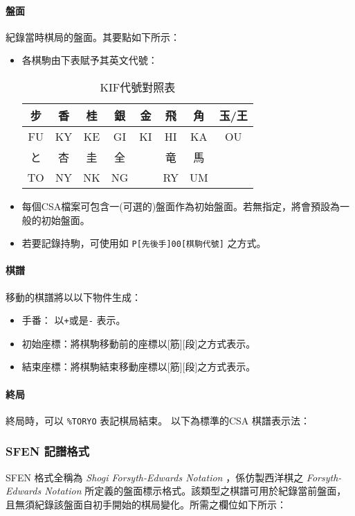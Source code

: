 	
	
	\paragraph{盤面} 紀錄當時棋局的盤面。其要點如下所示：
	\begin{itemize}
	
	    \item 各棋駒由下表賦予其英文代號：
	    \begin{table}[h]
	        \centering
	        \begin{tabular}{c|c|c|c|c|c|c|c}
	           步  &香 & 桂 &銀&金&飛&角&玉/王 \\
	           \hline
	             FU  &KY & KE &GI&KI&HI&KA&OU\\
	            \hline
	            と  &杏 & 圭 &全&&竜&馬\\
	            \hline
	            TO &NY & NK &NG& &RY&UM\\
	        \end{tabular}
	        \caption{KIF代號對照表}
	        \label{tab:my_label}
	    \end{table}
	    \item 每個CSA檔案可包含一(可選的)盤面作為初始盤面。若無指定，將會預設為一般的初始盤面。

	    \item 若要記錄持駒，可使用如 \verb|P[先後手]00[棋駒代號]| 之方式。 
	    
	\end{itemize}
	\paragraph{棋譜} 移動的棋譜將以以下物件生成：
	    \begin{itemize}
	        \item 手番： 以\verb|+|或是\verb|-| 表示。
	        \item 初始座標：將棋駒移動前的座標以[筋][段]之方式表示。
	        \item 結束座標：將棋駒結束移動座標以[筋][段]之方式表示。
	    \end{itemize}
	\paragraph{終局} 終局時，可以 \verb|%TORYO| 表記棋局結束。
	以下為標準的CSA 棋譜表示法：
	
	\subsubsection{SFEN 記譜格式\cite{SFEN}}
	\label{chap:sfen}
	SFEN 格式全稱為 \textit{Shogi Forsyth-Edwards Notation} ，係仿製西洋棋之 \textit{Forsyth-Edwards Notation} \cite{FEN} 所定義的盤面標示格式。該類型之棋譜可用於紀錄當前盤面，且無須紀錄該盤面自初手開始的棋局變化。所需之欄位如下所示：
